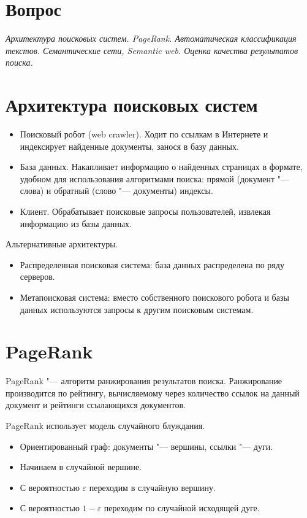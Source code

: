 \documentclass[a4paper,12pt]{article}
\renewcommand{\epsilon}{\varepsilon}
\begin{document}
\section*{Вопрос }
{\em Архитектура поисковых систем. PageRank. Автоматическая
классификация текстов. Семантические сети, Semantic web.
Оценка качества результатов поиска.}


\section{Архитектура поисковых систем}

\begin{itemize}
\item Поисковый робот (web crawler). Ходит по ссылкам в Интернете
и индексирует найденные документы, занося в базу данных.
\item База данных. Накапливает информацию о найденных страницах
в формате, удобном для использования алгоритмами поиска: прямой
(документ "--- слова) и обратный (слово "--- документы) индексы.
\item Клиент. Обрабатывает поисковые запросы пользователей, извлекая
информацию из базы данных.
\end{itemize}

Альтернативные архитектуры.
\begin{itemize}
\item Распределенная поисковая система: база данных распределена
по ряду серверов.
\item Метапоисковая система: вместо собственного поискового робота
и базы данных используются запросы к другим поисковым системам.
\end{itemize}


\section{PageRank}

PageRank "--- алгоритм ранжирования результатов поиска. Ранжирование
производится по рейтингу, вычисляемому через количество ссылок
на данный документ и рейтинги ссылающихся документов.

PageRank использует модель случайного блуждания.
\begin{itemize}
\item Ориентированный граф: документы "--- вершины, ссылки "--- дуги.
\item Начинаем в случайной вершине.
\item С вероятностью $\epsilon$ переходим в случайную вершину.
\item С вероятностью $1-\epsilon$ переходим по случайной исходящей дуге.
\end{itemize}
\end{document}
